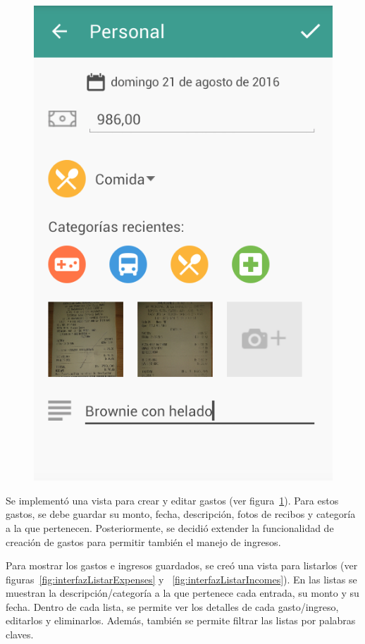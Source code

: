 \begin{figure}[ht]
\begin{minipage}{.5\textwidth}
  \includegraphics[scale=0.45,type=png,ext=.png,read=.png]{imagenes/create_entry}
  \captionsetup{justification=centering}
  \label{fig:interfazCrearEntry}
\end{minipage}
\end{figure}

Se implementó una vista para crear y editar gastos (ver figura~\ref{fig:interfazCrearEntry}). Para estos gastos, se debe guardar su monto, fecha, descripción, fotos de recibos y categoría a la que pertenecen. Posteriormente, se decidió extender la funcionalidad de creación de gastos para permitir también el manejo de ingresos. 

Para mostrar los gastos e ingresos guardados, se creó una vista para listarlos (ver figuras~\ref{fig:interfazListarExpenses} y ~\ref{fig:interfazListarIncomes}). En las listas se muestran la descripción/categoría a la que pertenece cada entrada, su monto y su fecha. Dentro de cada lista, se permite ver los detalles de cada gasto/ingreso, editarlos y eliminarlos. Además, también se permite filtrar las listas por palabras claves.

